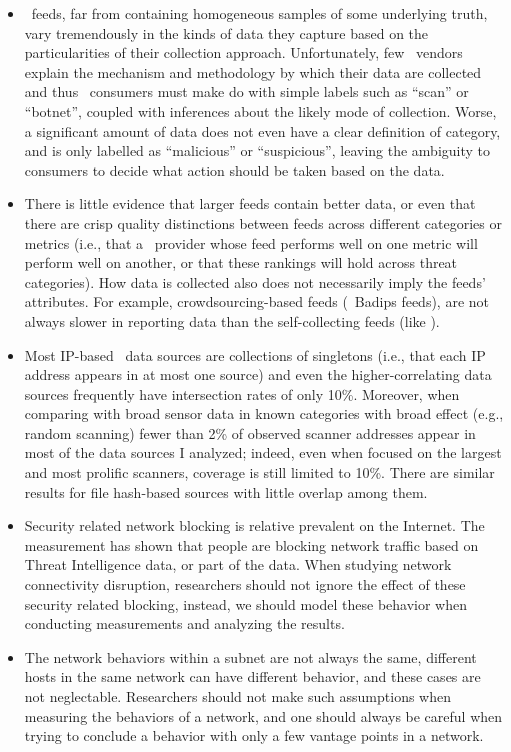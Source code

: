 \begin{itemize}
	\item \ti\ feeds, far from containing
    homogeneous samples of some underlying truth, vary tremendously in the
    kinds of data they capture based on the particularities of their
    collection approach. Unfortunately, few \ti\ vendors explain the
    mechanism and methodology by which their data are collected and thus
    \ti\ consumers must make do with simple labels such as
    ``scan'' or ``botnet'', coupled with inferences about the
    likely mode of collection. Worse, a significant amount of data does not
    even have a clear definition of category, and is only labelled as
    ``malicious'' or ``suspicious'', leaving the ambiguity to consumers to
    decide what action should be taken based on the data.

    \item There is little evidence
    that larger feeds contain better data, or even that there are
    crisp quality distinctions between feeds across different categories
    or metrics (i.e., that a \ti\ provider whose feed performs well on one
    metric will perform well on another, or that these rankings will hold
    across threat categories). How data is collected also does not
    necessarily imply the feeds' attributes. For example, crowdsourcing-based feeds (\eg\ Badips feeds), are not always slower in reporting data
    than the self-collecting feeds (like \feedetiprep).

    \item Most IP-based \ti\ data sources are collections of
    singletons (i.e., that each IP address appears in at most one source)
    and even the higher-correlating data sources frequently have
    intersection rates of only 10\%. Moreover, when comparing with broad
    sensor data in known categories with broad effect (e.g., random
    scanning) fewer than 2\% of observed scanner addresses appear in most of
    the data sources I analyzed; indeed, even when focused on the largest
    and most prolific scanners, coverage is still limited to 10\%. There
    are similar results for file hash-based sources with little overlap
    among them.
    
    \item Security related network blocking is relative prevalent on the
    Internet. The measurement has shown that people are blocking network 
    traffic based on Threat Intelligence data, or part of the data. When
    studying network connectivity disruption, researchers should not ignore 
    the effect of these security related blocking, instead, we should model 
    these behavior when conducting measurements and analyzing the results.
    
    \item The network behaviors within a subnet are not always the same, 
    different hosts in the same network can have different behavior, and 
    these cases are not neglectable. Researchers should not make such 
    assumptions when measuring the behaviors of a network, and one should
    always be careful when trying to conclude a behavior with only a few
    vantage points in a network.
    
\end{itemize}

